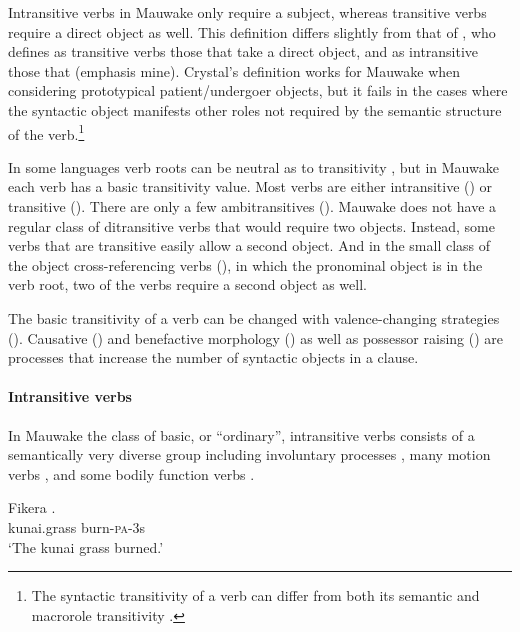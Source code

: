 Intransitive verbs in Mauwake only require a subject, whereas transitive verbs require a direct object as well. This definition differs slightly from that of \citet[397]{Crystal1997}, who defines as transitive verbs those that  take a direct object, and as intransitive those that  (emphasis mine). Crystal's definition works for Mauwake when considering prototypical patient/undergoer objects, but it fails in the cases where the syntactic object manifests other roles not required by the semantic structure of the verb.\footnote{The syntactic transitivity of a verb can differ from both its semantic and macrorole transitivity \citep{VanValinEtAl1997}.} 

In some languages verb roots can be neutral as to transitivity \citep[53]{Kittila2002}, but in Mauwake each verb has a basic transitivity value. Most verbs are either intransitive () or transitive (). There are only a few ambitransitives (). Mauwake does not have a regular class of ditransitive verbs that would require two objects. Instead, some verbs that are transitive easily allow a second object. And in the small class of the object cross-referencing verbs (), in which the pronominal object is in the verb root, two of the verbs require a second object as well. 

The basic transitivity of a verb can be changed with valence-changing strategies (). Causative () and benefactive morphology () as well as possessor raising () are processes that increase the number of syntactic objects in a clause.

\paragraph{Intransitive verbs}\label{sec:3.8.4.2.1}
{}
In Mauwake the class of basic, or ``ordinary'', intransitive verbs consists of a semantically very diverse group including involuntary processes , many motion verbs , and some bodily function verbs .

\ea%
\label{ex:3:x266}
\gll Fikera . \\
kunai.grass burn-\textsc{pa}-3s \\
\glt`The kunai grass burned.'
\z

